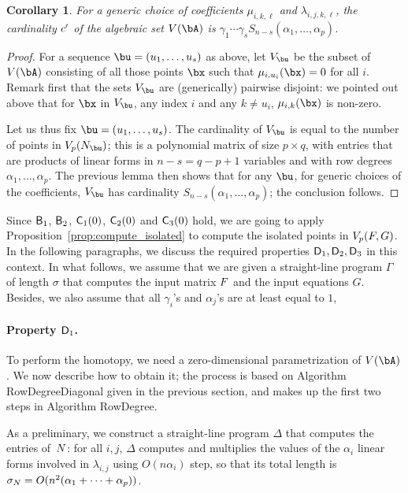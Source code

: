 \documentclass[12pt]{article}
\newtheorem{corollary}[definition]{Corollary}
\begin{document}
\begin{corollary}\label{coro:complete}
  For a generic choice of coefficients $\mu_{i,k,\ell}$ and
  $\lambda_{i,j,k,\ell}$, the cardinality ${c'}{}$ of the algebraic set
  $V(\bA)$ is $\gamma_1 \cdots \gamma_s S_{n-s}(\alpha_1,\dots,\alpha_p)$.
\end{corollary}
\begin{proof}
  For a sequence $\bu=(u_1,\dots,u_s)$ as above, let $V_\bu$ be the
  subset of $V(\bA)$ consisting of all those points $\bx$ such that
  $\mu_{i,u_i}(\bx)=0$ for all $i$. Remark first that the sets $V_\bu$
  are (generically) pairwise disjoint: we pointed out above that for
  $\bx$ in $V_\bu$, any index $i$ and any $k \ne u_i$,
  $\mu_{i,k}(\bx)$ is non-zero.
  
  Let us thus fix $\bu=(u_1,\dots,u_s)$. The cardinality of $V_\bu$ is
  equal to the number of points in $V_p(\mN_\bu)$; this is a
  polynomial matrix of size $p \times q$, with entries that are
  products of linear forms in $n-s=q-p+1$ variables and with row
  degrees $\alpha_1,\dots,\alpha_p$. The previous lemma then shows
  that for any $\bu$, for generic choices of the coefficients, $V_\bu$
  has cardinality $S_{n-s}(\alpha_1,\dots,\alpha_p)$; the conclusion
  follows.
\end{proof}



Since $\mathsf{B}_1$, $\mathsf{B}_2$, $\mathsf{C}_1(0)$, $\mathsf{C}_2(0)$ and
$\mathsf{C}_3(0)$ hold, we are going to apply
Proposition~\ref{prop:compute_isolated} to compute the isolated points
in $V_{p}({F},G)$. In the following paragraphs, we discuss the required
properties $\mathsf{D}_1,\mathsf{D}_2,\mathsf{D}_3$ in this context. In what follows,
we assume that we are given a straight-line program $\Gamma$ of length
$\sigma$ that computes the input matrix ${F}$ and the input equations $G$.
Besides, we also assume
that all $\gamma_i$'s and $\alpha_j$'s are at least equal to $1$,


\paragraph{Property $\mathsf{D}_1$.} To perform the homotopy, we need a zero-dimensional parametrization of
$V(\bA)$. We now describe how to obtain it; the process is based on
Algorithm {\sf RowDegreeDiagonal} given in the previous section, and
makes up the first two steps in Algorithm {\sf RowDegree}.

As a preliminary, we construct a straight-line program $\Delta$ that
computes the entries of~${N}$: for all $i,j$, $\Delta$ computes and multiplies
the values of the $\alpha_i$ linear forms involved in $\lambda_{i,j}$
using $O(n \alpha_i)$ step, so that its total length is $\sigma_{{N}}=O(n^2
(\alpha_1+\cdots+\alpha_p))$.
\end{document}
